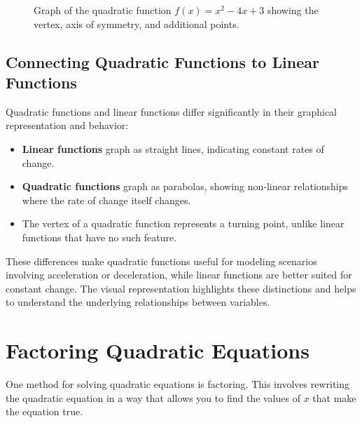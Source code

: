\begin{figure}[h!]
    \centering
    \caption{Graph of the quadratic function \( f(x) = x^2 - 4x + 3 \) showing the vertex, axis of symmetry, and additional points.}
\end{figure}

\subsection{Connecting Quadratic Functions to Linear Functions}

Quadratic functions and linear functions differ significantly in their graphical representation and behavior:

\begin{itemize}
    \item \textbf{Linear functions} graph as straight lines, indicating constant rates of change.
    \item \textbf{Quadratic functions} graph as parabolas, showing non-linear relationships where the rate of change itself changes.
    \item The vertex of a quadratic function represents a turning point, unlike linear functions that have no such feature.
\end{itemize}

These differences make quadratic functions useful for modeling scenarios involving acceleration or deceleration, while linear functions are better suited for constant change. The visual representation highlights these distinctions and helps to understand the underlying relationships between variables.


\section{Factoring Quadratic Equations}
One method for solving quadratic equations is factoring. This involves rewriting the quadratic equation in a way that allows you to find the values of \( x \) that make the equation true.

